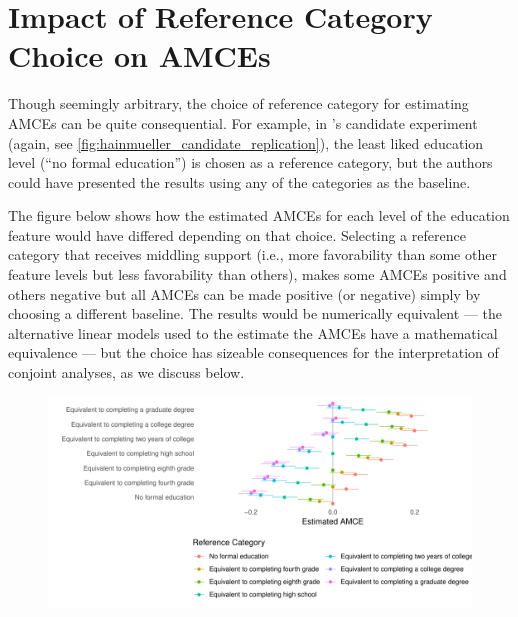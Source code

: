 \documentclass[a4paper,12pt]{article}\usepackage[]{graphicx}\usepackage[]{color}
\makeatletter
\def\maxwidth{ %
  \ifdim\Gin@nat@width>\linewidth
    \linewidth
  \else
    \Gin@nat@width
  \fi
}
\newenvironment{knitrout}{}{} %
\makeatother
\begin{document}
\clearpage

\section{Impact of Reference Category Choice on AMCEs}\label{app:referencecategory}

Though seemingly arbitrary, the choice of reference category for estimating AMCEs can be quite consequential. For example, in \citeauthor{HainmuellerHopkinsYamamoto2014}'s candidate experiment (again, see \ref{fig:hainmueller_candidate_replication}), the least liked education level (``no formal education'') is chosen as a reference category, but the authors could have presented the results using any of the categories as the baseline.

The figure below shows how the estimated AMCEs for each level of the education feature would have differed depending on that choice. Selecting a reference category that receives middling support (i.e., more favorability than some other feature levels but less favorability than others), makes some AMCEs positive and others negative but all AMCEs can be made positive (or negative) simply by choosing a different baseline. The results would be numerically equivalent --- the alternative linear models used to the estimate the AMCEs have a mathematical equivalence --- but the choice has sizeable consequences for the interpretation of conjoint analyses, as we discuss below.

\begin{knitrout}
\color{fgcolor}\begin{figure}[h]
\includegraphics[width=\maxwidth]{figure/reference_category-1} \end{figure}


\end{knitrout}
\end{document}
